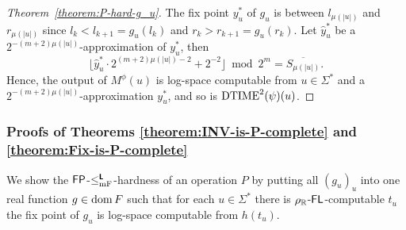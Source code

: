 \documentclass[envcountsame,orivec,oribibl]{llncs}
\begin{document}
\begin{proof}[Theorem~\ref{theorem:P-hard-g_u}]
 The fix point $y^*_u$ of $g_u$ is between $l_{\mu(|u|)}$ and $r_{\mu(|u|)}$ 
 since $l_k < l_{k+1} = g_u(l_k)$ and $r_k > r_{k+1} = g_u(r_k)$.
 Let $\hat y^*_u$ be a $2^{-(m+2)\mu(|u|)}$-approximation of $y^*_u$, then
\begin{equation}
 \lfloor \hat y^*_u \cdot 2^{(m+2)\mu(|u|)-2} + 2^{-2}\rfloor  \bmod 2^m
  =
  \overline{S_{\mu(|u|)}}.
\end{equation}
 Hence, the output of $M^\phi(u)$ is log-space computable from 
 $u \in \Sigma^*$ and a $2^{-(m+2)\mu(|u|)}$-approximation $y^*_u$, and so is
 $\mathrm{DTIME}^2(\psi)(u)$.
\end{proof}


\subsubsection{Proofs of Theorems \ref{theorem:INV-is-P-complete} and \ref{theorem:Fix-is-P-complete}}
\label{section:proofs-of-theorems}

We show the $\mathsf{FP}$-$\leq _{\mathrm{mF}} ^{\text{\bfseries \sffamily \upshape L}}$-hardness of an operation $P$
by putting all $(g_u)_u$ into one real function $g \in \mathop{\rm dom} F$
such that for each $u \in \Sigma^*$ there is $\rho _\mathbb R$-$\mathsf{FL}$-computable
$t_u$ the fix point of $g_u$ is log-space computable from $h(t_u)$.
\end{document}
